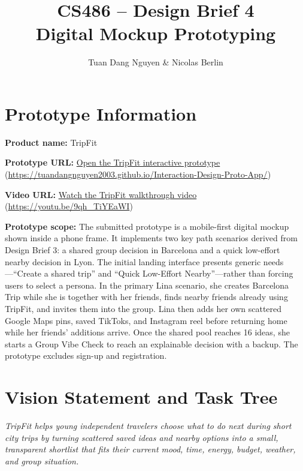 \documentclass[11pt,a4paper]{article}
\title{CS486 -- Design Brief 4\\Digital Mockup Prototyping}
\author{Tuan Dang Nguyen \& Nicolas Berlin}
\date{}
\begin{document}
\maketitle

\section{Prototype Information}

\textbf{Product name:} TripFit

\textbf{Prototype URL:} \href{https://tuandangnguyen2003.github.io/Interaction-Design-Proto-App/}{Open the TripFit interactive prototype} (\url{https://tuandangnguyen2003.github.io/Interaction-Design-Proto-App/})

\textbf{Video URL:} \href{https://youtu.be/9qh_TiYEaWI}{Watch the TripFit walkthrough video} (\url{https://youtu.be/9qh_TiYEaWI})

\textbf{Prototype scope:} The submitted prototype is a mobile-first digital mockup shown inside a phone frame. It implements two key path scenarios derived from Design Brief 3: a shared group decision in Barcelona and a quick low-effort nearby decision in Lyon. The initial landing interface presents generic needs---``Create a shared trip'' and ``Quick Low-Effort Nearby''---rather than forcing users to select a persona. In the primary Lina scenario, she creates Barcelona Trip while she is together with her friends, finds nearby friends already using TripFit, and invites them into the group. Lina then adds her own scattered Google Maps pins, saved TikToks, and Instagram reel before returning home while her friends' additions arrive. Once the shared pool reaches 16 ideas, she starts a Group Vibe Check to reach an explainable decision with a backup. The prototype excludes sign-up and registration.

\section{Vision Statement and Task Tree}

\textit{TripFit helps young independent travelers choose what to do next during short city trips by turning scattered saved ideas and nearby options into a small, transparent shortlist that fits their current mood, time, energy, budget, weather, and group situation.}
\end{document}

